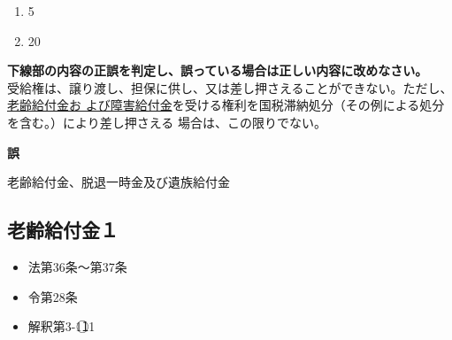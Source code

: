 \begin{answerbox}
  \begin{enumerate}[A:]
    \item 5
    \item 20
  \end{enumerate}
\end{answerbox}

\begin{truefalse}[年金1 2024 問題1(3)ウ]
      \textbf{下線部の内容の正誤を判定し、誤っている場合は正しい内容に改めなさい。}
  \\

  受給権は、譲り渡し、担保に供し、又は差し押さえることができない。ただし、\underline{老齢給付金お
よび障害給付金}を受ける権利を国税滞納処分（その例による処分を含む。）により差し押さえる
場合は、この限りでない。
\end{truefalse}

\begin{answerbox}
  \textbf{誤}

  老齢給付金、脱退一時金及び遺族給付金
\end{answerbox}

\newpage

\subsection{老齢給付金１}


\begin{InyouJobunbox}
  \begin{itemize}
    \item 法第36条〜第37条
    \item 令第28条
    \item 解釈第3-1\textcircled{11}
  \end{itemize}
\end{InyouJobunbox}

